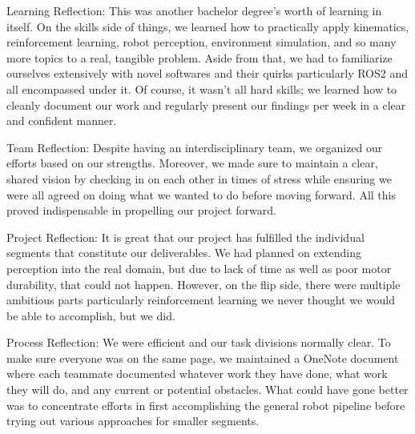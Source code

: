 Learning Reflection: This was another bachelor degree's worth of learning in itself. On the skills side of things, we learned how to practically apply kinematics, reinforcement learning, robot perception, environment simulation, and so many more topics to a real, tangible problem. Aside from that, we had to familiarize ourselves extensively with novel softwares and their quirks particularly ROS2 and all encompassed under it. Of course, it wasn't all hard skills; we learned how to cleanly document our work and regularly present our findings per week in a clear and confident manner.

Team Reflection: Despite having an interdisciplinary team, we organized our efforts based on our strengths. Moreover, we made sure to maintain a clear, shared vision by checking in on each other in times of stress while ensuring we were all agreed on doing what we wanted to do before moving forward. All this proved indispensable in propelling our project forward.

Project Reflection: It is great that our project has fulfilled the individual segments that constitute our deliverables. We had planned on extending perception into the real domain, but due to lack of time as well as poor motor durability, that could not happen. However, on the flip side, there were multiple ambitious parts particularly reinforcement learning we never thought we would be able to accomplish, but we did.

Process Reflection: We were efficient and our task divisions normally clear. To make sure everyone was on the same page, we maintained a OneNote document where each teammate documented whatever work they have done, what work they will do, and any current or potential obstacles. What could have gone better was to concentrate efforts in first accomplishing the general robot pipeline before trying out various approaches for smaller segments.
